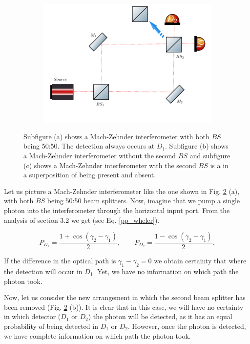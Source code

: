 \documentclass[12pt]{book}
\begin{document}
\begin{figure}[t!]
\begin{subfigure}{0.45\linewidth}
\includegraphics[width=\linewidth]{images/wheeler3.png}
\caption{}
\label{wheeler3}
\end{subfigure}
\caption{Subfigure (a) shows a Mach-Zehnder interferometer with both $BS$ being 50:50. The detection always occurs at $D_{1}$. Subfigure (b) shows a Mach-Zehnder interferometer without the second $BS$ and subfigure (c) shows a Mach-Zehnder interferometer with the second $BS$ is a in a superposition of being present and absent.}
\label{Wheeler}
\end{figure}

Let us picture a Mach-Zehnder interferometer like the one shown in Fig. \ref{Wheeler} (a), with both $BS$ being 50:50 beam splitters. Now, imagine that we pump a single photon into the interferometer through the horizontal input port. From the analysis of section 3.2 we get (see Eq. \ref{pp_wheler}).

\begin{equation}
P_{D_{1}}=\frac{1+\cos(\gamma_{2}-\gamma_{1})}{2}, \qquad P_{D_{2}}=\frac{1-\cos(\gamma_{2}-\gamma_{1})}{2}. \label{pp_wheler}
\end{equation}

 If the difference in the optical path is $\gamma_{1}-\gamma_{2}=0$  we obtain certainty that where the detection will occur in $D_{1}$. Yet, we have no information on which path the photon took.



Now, let us consider the new arrangement in which the second beam splitter has been removed (Fig. \ref{Wheeler} (b)). It is clear that in this case, we will have no certainty in which detector ($D_{1}$ or $D_{2}$) the photon will be detected, as it has an equal probability of being detected in $D_{1}$ or $D_{2}$. However, once the photon is detected, we have complete information on which path the photon took.
\end{document}
